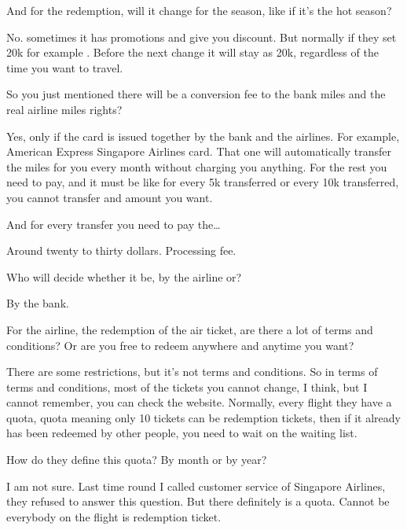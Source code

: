 \begin{description}[leftmargin=4em,style=nextline]
	\item[JH:] And for the redemption, will it change for the season, like if it’s the hot season?

	\item[HJ:] No. sometimes it has promotions and give you discount. But normally if they set 20k for example . Before the next change it will stay as 20k, regardless of the time you want to travel.

	\item[JH:] So you just mentioned there will be a conversion fee to the bank miles and the real airline miles rights?

	\item[HJ:] Yes, only if the card is issued together by the bank and the airlines. For example, American Express Singapore Airlines card. That one will automatically transfer the miles for you every month without charging you anything. For the rest you need to pay, and it must be like for every 5k transferred or every 10k transferred, you cannot transfer and amount you want.

	\item[JH:] And for every transfer you need to pay the…

	\item[HJ:] Around twenty to thirty dollars. Processing fee.

	\item[JH:] Who will decide whether it be, by the airline or?

	\item[HJ:] By the bank.

	\item[LD:] For the airline, the redemption of the air ticket, are there a lot of terms and conditions? Or are you free to redeem anywhere and anytime you want?

	\item[HJ:] There are some restrictions, but it’s not terms and conditions. So in terms of terms and conditions, most of the tickets you cannot change, I think, but I cannot remember, you can check the website. Normally, every flight they have a quota, quota meaning only 10 tickets can be redemption tickets, then if it already has been redeemed by other people, you need to wait on the waiting list.

	\item[JH:] How do they define this quota? By month or by year?

	\item[HJ:] I am not sure. Last time round I called customer service of Singapore Airlines, they refused to answer this question. But there definitely is a quota. Cannot be everybody on the flight is redemption ticket.


\end{description}
